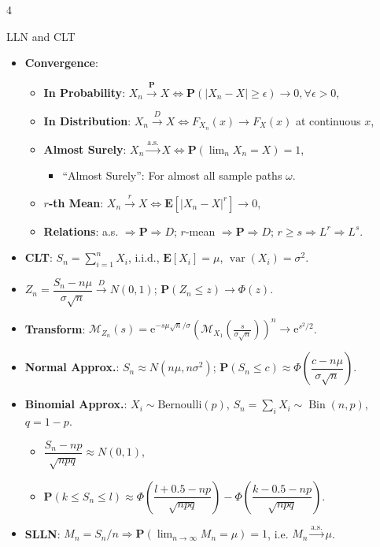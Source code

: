 \documentclass[landscape,a4paper]{article}
\newcommand{\e}{\mathrm{e}}
\newcommand{\PP}{\mathbf{P}}
\newcommand{\EE}{\mathbf{E}}
\newcommand{\var}{\operatorname{var}}
\begin{document}
\begin{multicols*}{4}
\begin{card}{LLN and CLT}
\begin{itemize}
\begin{itemize}
				\end{itemize}
				\item \textbf{Convergence}:
				\begin{itemize}
					\item \textbf{In Probability}: $X_n\xrightarrow{\PP}X\Leftrightarrow \PP(|X_n-X|\ge\epsilon)\to0,\forall\epsilon>0$,
					\item \textbf{In Distribution}: $X_n\xrightarrow{D}X\Leftrightarrow F_{X_n}(x)\to F_X(x)$ at continuous $x$,
					\item \textbf{Almost Surely}: $X_n\xrightarrow{\mathrm{a.s.}}X\Leftrightarrow \PP(\lim_nX_n=X)=1$,
					\begin{itemize}
						\item ``Almost Surely'': For almost all sample paths $\omega$.
					\end{itemize}
					\item \textbf{$r$-th Mean}: $X_n\xrightarrow{r}X\Leftrightarrow \EE[|X_n-X|^r]\to0$,
					\item \textbf{Relations}: a.s. $\Rightarrow \PP\Rightarrow D$; $r$-mean $\Rightarrow \PP\Rightarrow D$; $r\ge s\Rightarrow L^r\Rightarrow L^s$.
				\end{itemize}
				\item \textbf{CLT}: $S_n=\sum_{i=1}^nX_i$, i.i.d., $\EE[X_i]=\mu$, $\var(X_i)=\sigma^2$.
				\item $Z_n=\dfrac{S_n-n\mu}{\sigma\sqrt n}\xrightarrow{D}N(0,1)$; $\PP(Z_n\le z)\to\varPhi(z)$.
				\item \textbf{Transform}: $\mathscr{M}_{Z_n}(s)=\e^{-s\mu\sqrt n/\sigma}\left(\mathscr{M}_{X_1}\left(\frac{s}{\sigma\sqrt n}\right)\right)^n\to \e^{s^2/2}$.
				\item \textbf{Normal Approx.}: $S_n\approx N(n\mu,n\sigma^2)$; $\PP(S_n\le c)\approx\varPhi\left(\dfrac{c-n\mu}{\sigma\sqrt n}\right)$.
				\item \textbf{Binomial Approx.}: $X_i\sim\text{Bernoulli}(p)$, $S_n=\sum_iX_i\sim\operatorname{Bin}(n,p)$,\\ $q=1-p$.
				\begin{itemize}
					\item $\dfrac{S_n-np}{\sqrt{npq}}\approx N(0,1)$,
					\item $\PP(k\le S_n\le l)\approx\varPhi\left(\dfrac{l+0.5-np}{\sqrt{npq}}\right)-\varPhi\left(\dfrac{k-0.5-np}{\sqrt{npq}}\right)$.
				\end{itemize}
				\item \textbf{SLLN}: $M_n=S_n/n\Rightarrow \PP(\lim_{n\to\infty}M_n=\mu)=1$, i.e. $M_n\xrightarrow{\mathrm{a.s.}}\mu$.

\end{itemize}
\end{card}
\end{multicols*}
\end{document}
